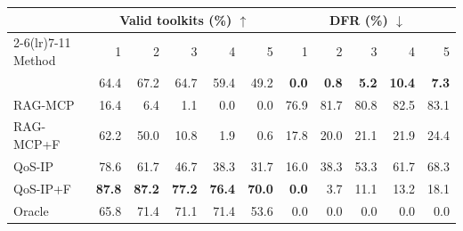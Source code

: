 \begin{tabular}{lrrrrrrrrrr}\toprule
& \multicolumn{5}{c}{Valid toolkits (\%) $\uparrow$} & \multicolumn{5}{c}{DFR (\%) $\downarrow$} \\ \cmidrule(lr){2-6}\cmidrule(lr){7-11}
Method & 1 & 2 & 3 & 4 & 5 & 1 & 2 & 3 & 4 & 5 \\ \midrule
\sysname{} & 64.4 & 67.2 & 64.7 & 59.4 & 49.2 & \textbf{0.0} & \textbf{0.8} & \textbf{5.2} & \textbf{10.4} & \textbf{7.3} \\
RAG-MCP & 16.4 & 6.4 & 1.1 & 0.0 & 0.0 & 76.9 & 81.7 & 80.8 & 82.5 & 83.1 \\
RAG-MCP+F & 62.2 & 50.0 & 10.8 & 1.9 & 0.6 & 17.8 & 20.0 & 21.1 & 21.9 & 24.4 \\
QoS-IP & 78.6 & 61.7 & 46.7 & 38.3 & 31.7 & 16.0 & 38.3 & 53.3 & 61.7 & 68.3 \\
QoS-IP+F & \textbf{87.8} & \textbf{87.2} & \textbf{77.2} & \textbf{76.4} & \textbf{70.0} & \textbf{0.0} & 3.7 & 11.1 & 13.2 & 18.1 \\
\midrule
Oracle & 65.8 & 71.4 & 71.1 & 71.4 & 53.6 & 0.0 & 0.0 & 0.0 & 0.0 & 0.0 \\
\bottomrule\end{tabular}
